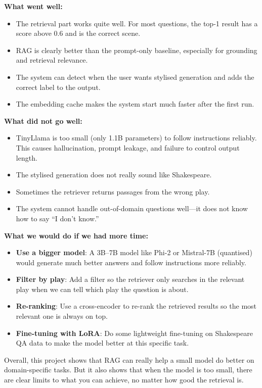 \documentclass[10pt,conference]{IEEEtran}
\begin{document}
\textbf{What went well:}
\begin{itemize}
    \item The retrieval part works quite well. For most questions, the top-1 result has a score above 0.6 and is the correct scene.
    \item RAG is clearly better than the prompt-only baseline, especially for grounding and retrieval relevance.
    \item The system can detect when the user wants stylised generation and adds the correct label to the output.
    \item The embedding cache makes the system start much faster after the first run.
\end{itemize}

\textbf{What did not go well:}
\begin{itemize}
    \item TinyLlama is too small (only 1.1B parameters) to follow instructions reliably. This causes hallucination, prompt leakage, and failure to control output length.
    \item The stylised generation does not really sound like Shakespeare.
    \item Sometimes the retriever returns passages from the wrong play.
    \item The system cannot handle out-of-domain questions well---it does not know how to say ``I don't know.''
\end{itemize}

\textbf{What we would do if we had more time:}
\begin{itemize}
    \item \textbf{Use a bigger model}: A 3B--7B model like Phi-2 or Mistral-7B (quantised) would generate much better answers and follow instructions more reliably.
    \item \textbf{Filter by play}: Add a filter so the retriever only searches in the relevant play when we can tell which play the question is about.
    \item \textbf{Re-ranking}: Use a cross-encoder to re-rank the retrieved results so the most relevant one is always on top.
    \item \textbf{Fine-tuning with LoRA}: Do some lightweight fine-tuning on Shakespeare QA data to make the model better at this specific task.
\end{itemize}

Overall, this project shows that RAG can really help a small model do better on domain-specific tasks. But it also shows that when the model is too small, there are clear limits to what you can achieve, no matter how good the retrieval is.
\end{document}
